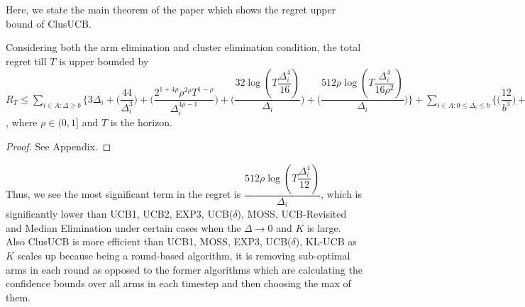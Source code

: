 	
	Here, we state the main theorem of the paper which shows the regret upper bound of ClusUCB.
	
\begin{theorem}
Considering both the arm elimination and cluster elimination condition, the total regret till $T$ is upper bounded by $R_{T}\leq \sum_{i\in A:\Delta\geq b} \bigg\lbrace 3\Delta_{i}+ \bigg(\dfrac{44}{\Delta_{i}^{3}}\bigg) + \bigg(\dfrac{2^{1+4\rho}\rho^{2\rho}T^{1-\rho}}{\Delta_{i}^{4\rho-1}}\bigg) + \bigg(\dfrac{32\log{(T\dfrac{\Delta_{i}^{4}}{16})}}{\Delta_{i}}\bigg) + \bigg(\dfrac{512\rho\log{(T\dfrac{\Delta_{i}^{4}}{16\rho^{2}})}}{\Delta_{i}}\bigg)\bigg\rbrace + \sum_{i\in A:0\leq\Delta_{i}\leq b}\bigg\lbrace \bigg(\dfrac{12}{b^{3}} \bigg) + \bigg(\dfrac{T^{1-\rho}2^{2\rho+\frac{3}{2}}}{\Delta_{i}^{3}} \bigg)+\bigg(\dfrac{T^{1-\rho}2^{2\rho+\frac{3}{2}}}{b^{4\rho -1}} \bigg) \bigg\rbrace + max_{i:\Delta\leq b}\Delta_{i}T $, where $\rho\in (0,1]$ and $T$ is the horizon.
\end{theorem}

\begin{proof}
	See Appendix.
\end{proof}

\begin{remark}
	Thus, we see the most significant term in the regret is $\dfrac{512\rho\log{(T\dfrac{\Delta_{i}^{4}}{12})}}{\Delta_{i}}$, which is significantly lower than UCB1, UCB2, EXP3, UCB($\delta$), MOSS, UCB-Revisited and Median Elimination under certain cases when the $\Delta \rightarrow 0$ and $K$ is large. Also ClusUCB is more efficient than UCB1, MOSS, EXP3, UCB($\delta$), KL-UCB as $K$ scales up because being a round-based algorithm, it is removing sub-optimal arms in each round as opposed to the former algorithms which are calculating the confidence bounds over all arms in each timestep and then choosing the max of them. %
\end{remark}	




